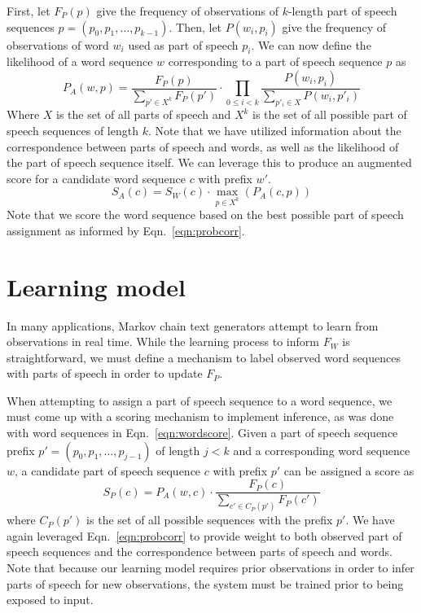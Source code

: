 \documentclass[11pt]{article}
\begin{document}
First, let $F_P(p)$ give the frequency of observations of $k$-length part of speech sequences
$p = (p_0, p_1, \dots, {p_{k-1}})$.
%
Then, let $P(w_i, p_i)$ give the frequency of observations of word $w_i$ used as
part of speech $p_i$.
%
We can now define the likelihood of a word sequence $w$ corresponding to a part of speech
sequence $p$ as
%
\begin{equation}
\label{eqn:probcorr}
P_A(w, p) =  \frac{F_P(p)}{\sum_{p' \in X^k} F_P(p')} \cdot \prod_{0 \leq i < k} \frac{P(w_i, p_i)}{\sum_{p'_i \in X} P(w_i, p'_i) }
\end{equation}
%
Where $X$ is the set of all parts of speech and $X^k$ is the set of all possible part of speech
sequences of length $k$.
%
Note that we have utilized information about the correspondence between parts of speech
and words, as well as the likelihood of the part of speech sequence itself.
%
We can leverage this to produce an augmented score for a candidate word sequence $c$
with prefix $w'$.
%
\begin{equation}
\label{eqn:augscore}
S_A(c) = S_W(c) \cdot \max_{p \in X^k} \left( P_A(c, p) \right)
\end{equation}
%
Note that we score the word sequence based on the best possible part of speech assignment
as informed by Eqn.~\ref{eqn:probcorr}.
%

\section{Learning model}

In many applications, Markov chain text generators attempt to learn from observations in
real time.
%
While the learning process to inform $F_W$ is straightforward, we must define a mechanism
to label observed word sequences with parts of speech in order to update $F_P$.

When attempting to assign a part of speech sequence to a word sequence, we must come up with
a scoring mechanism to implement inference, as was done with word sequences in
Eqn.~\ref{eqn:wordscore}.
%
Given a part of speech sequence prefix $p' = (p_0, p_1, \dots, p_{j-1})$ of length $j < k$
and a corresponding word sequence $w$, a candidate part of speech sequence $c$ with prefix $p'$
can be assigned a score as 
%
\begin{equation}
\label{eqn:posscore}
S_P(c) = P_A(w, c) \cdot \frac{F_P(c)}{\sum_{c' \in C_P(p')} F_P(c')}
\end{equation}
%
where $C_P(p')$ is the set of all possible sequences with the prefix $p'$.
%
We have again leveraged Eqn.~\ref{eqn:probcorr} to provide weight to both observed
part of speech sequences and the correspondence between parts of speech and words.
%
Note that because our learning model requires prior observations in order to infer
parts of speech for new observations, the system must be trained prior to being
exposed to input.
%
\end{document}
